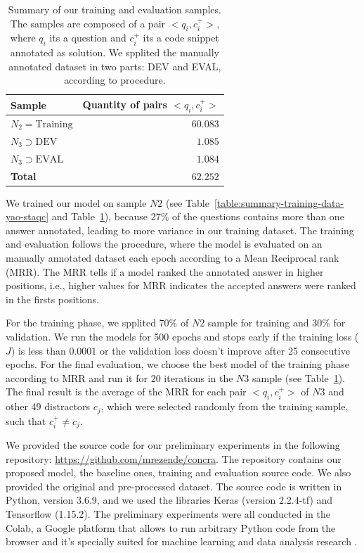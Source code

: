 \documentclass[sigconf]{acmart}
\begin{document}
\begin{table}[h]
\centering
\begin{tabular}{ l r  }
 \hline
 \textbf{Sample} & \textbf{Quantity of pairs $<q_{i}, c_{i}^{+}>$}\\
 \hline
 $N_{2} = \text{Training}$ & $60.083$\\
 
 $N_{3} \supset \text{DEV}$ & $1.085$ \\
 
 $N_{3} \supset \text{EVAL}$ & $1.084$\\
 \hline
 \textbf{Total} & $\bm{62.252}$\\
 \hline
\end{tabular}
\caption{Summary of our training and evaluation samples. The samples are composed of a pair $<q_{i}, c_{i}^{+}>$, where $q_{i}$ its a question and $c_{i}^{+}$ its a code snippet annotated as solution. We spplited the manually annotated dataset in two parts: DEV and EVAL, according to \cite{iyer-etal-2016-summarizing} procedure. }
\label{table:training-sample-division}
\end{table}

We trained our model on sample $N2$ (see Table~\ref{table:summary-training-data-yao-staqc} and Table~\ref{table:training-sample-division}), because 27\% of the questions contains more than one answer annotated, leading to more variance in our training dataset. The training and evaluation follows the \cite{iyer-etal-2016-summarizing} procedure, where the model is evaluated on an manually annotated dataset each epoch according to a Mean Reciprocal rank (MRR). The MRR tells if a model ranked the annotated answer in higher positions, i.e., higher values for MRR indicates the accepted answers were ranked in the firsts positions.

For the training phase, we spplited 70\% of $N2$ sample for training and 30\% for validation. We run the models for 500 epochs and stops early if the training loss ($J$) is less than $0.0001$ or the validation loss doesn't improve after 25 consecutive epochs. For the final evaluation, we choose the best model of the training phase according to MRR and run it for 20 iterations in the $N3$ sample (see Table~\ref{table:training-sample-division}). The final result is the average of the MRR for each pair $<q_{i}, c_{i}^{+}>$ of $N3$ and other 49 distractors $c_{j}$, which were selected randomly from the training sample, such that $c_{i}^{+} \neq c_{j}$.

 We provided the source code for our preliminary experiments in the following repository: \url{https://github.com/mrezende/concra}. The repository contains our proposed model, the baseline ones, training and evaluation source code. We also provided the original and pre-processed dataset. The source code is written in Python, version 3.6.9, and we used the libraries Keras (version 2.2.4-tf) and Tensorflow (1.15.2). The preliminary experiments were all conducted in the Colab, a Google platform that allows to run arbitrary Python code from the browser and it's specially suited for machine learning and data analysis research \cite{colab-2019}.
\end{document}
